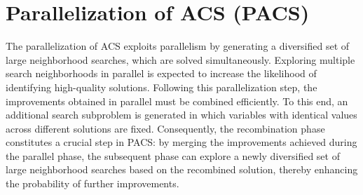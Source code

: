 \section{Parallelization of ACS (PACS)}
The parallelization of ACS exploits parallelism by generating a diversified set of large neighborhood searches, which are solved simultaneously. Exploring multiple search neighborhoods in parallel is expected to increase the likelihood of identifying high-quality solutions.
Following this parallelization step, the improvements obtained in parallel must be combined efficiently. To this end, an additional search subproblem is generated in which variables with identical values across different solutions are fixed. Consequently, the recombination phase constitutes a crucial step in PACS: by merging the improvements achieved during the parallel phase, the subsequent phase can explore a newly diversified set of large neighborhood searches based on the recombined solution, thereby enhancing the probability of further improvements.
